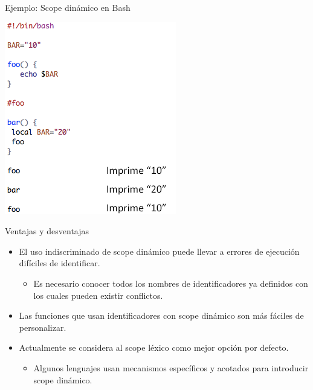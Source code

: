 \documentclass{beamer} %
\begin{document}
\begin{frame}{Ejemplo: Scope dinámico en Bash}
    \begin{center}
        \includegraphics[width=.6\textwidth]{./image/cap5/scope-bash}
    \end{center}
\end{frame}

\begin{frame}{Ventajas y desventajas}
    \begin{itemize}
        \item<1-> El uso indiscriminado de scope dinámico puede llevar a errores de ejecución difíciles de identificar.
        \begin{itemize}
            \item Es necesario conocer todos los nombres de identificadores ya definidos con los cuales pueden existir conflictos.
        \end{itemize}
        \item<2-> Las funciones que usan identificadores con scope dinámico son más fáciles de personalizar.
        \item<3-> Actualmente se considera al scope léxico como mejor opción por defecto.
        \begin{itemize}
            \item Algunos lenguajes usan mecanismos específicos y acotados para introducir scope dinámico.
        \end{itemize}
    \end{itemize}
\end{frame}

\end{document}
